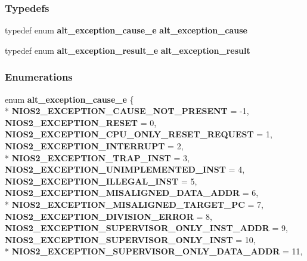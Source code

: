 \subsubsection*{Typedefs}
\begin{DoxyCompactItemize}
\item 
typedef enum {\bf alt\+\_\+exception\+\_\+cause\+\_\+e} {\bf alt\+\_\+exception\+\_\+cause}
\item 
typedef enum {\bf alt\+\_\+exception\+\_\+result\+\_\+e} {\bf alt\+\_\+exception\+\_\+result}
\end{DoxyCompactItemize}
\subsubsection*{Enumerations}
\begin{DoxyCompactItemize}
\item 
enum {\bf alt\+\_\+exception\+\_\+cause\+\_\+e} \{ \\*
{\bf N\+I\+O\+S2\+\_\+\+E\+X\+C\+E\+P\+T\+I\+O\+N\+\_\+\+C\+A\+U\+S\+E\+\_\+\+N\+O\+T\+\_\+\+P\+R\+E\+S\+E\+NT} = -\/1, 
{\bf N\+I\+O\+S2\+\_\+\+E\+X\+C\+E\+P\+T\+I\+O\+N\+\_\+\+R\+E\+S\+ET} = 0, 
{\bf N\+I\+O\+S2\+\_\+\+E\+X\+C\+E\+P\+T\+I\+O\+N\+\_\+\+C\+P\+U\+\_\+\+O\+N\+L\+Y\+\_\+\+R\+E\+S\+E\+T\+\_\+\+R\+E\+Q\+U\+E\+ST} = 1, 
{\bf N\+I\+O\+S2\+\_\+\+E\+X\+C\+E\+P\+T\+I\+O\+N\+\_\+\+I\+N\+T\+E\+R\+R\+U\+PT} = 2, 
\\*
{\bf N\+I\+O\+S2\+\_\+\+E\+X\+C\+E\+P\+T\+I\+O\+N\+\_\+\+T\+R\+A\+P\+\_\+\+I\+N\+ST} = 3, 
{\bf N\+I\+O\+S2\+\_\+\+E\+X\+C\+E\+P\+T\+I\+O\+N\+\_\+\+U\+N\+I\+M\+P\+L\+E\+M\+E\+N\+T\+E\+D\+\_\+\+I\+N\+ST} = 4, 
{\bf N\+I\+O\+S2\+\_\+\+E\+X\+C\+E\+P\+T\+I\+O\+N\+\_\+\+I\+L\+L\+E\+G\+A\+L\+\_\+\+I\+N\+ST} = 5, 
{\bf N\+I\+O\+S2\+\_\+\+E\+X\+C\+E\+P\+T\+I\+O\+N\+\_\+\+M\+I\+S\+A\+L\+I\+G\+N\+E\+D\+\_\+\+D\+A\+T\+A\+\_\+\+A\+D\+DR} = 6, 
\\*
{\bf N\+I\+O\+S2\+\_\+\+E\+X\+C\+E\+P\+T\+I\+O\+N\+\_\+\+M\+I\+S\+A\+L\+I\+G\+N\+E\+D\+\_\+\+T\+A\+R\+G\+E\+T\+\_\+\+PC} = 7, 
{\bf N\+I\+O\+S2\+\_\+\+E\+X\+C\+E\+P\+T\+I\+O\+N\+\_\+\+D\+I\+V\+I\+S\+I\+O\+N\+\_\+\+E\+R\+R\+OR} = 8, 
{\bf N\+I\+O\+S2\+\_\+\+E\+X\+C\+E\+P\+T\+I\+O\+N\+\_\+\+S\+U\+P\+E\+R\+V\+I\+S\+O\+R\+\_\+\+O\+N\+L\+Y\+\_\+\+I\+N\+S\+T\+\_\+\+A\+D\+DR} = 9, 
{\bf N\+I\+O\+S2\+\_\+\+E\+X\+C\+E\+P\+T\+I\+O\+N\+\_\+\+S\+U\+P\+E\+R\+V\+I\+S\+O\+R\+\_\+\+O\+N\+L\+Y\+\_\+\+I\+N\+ST} = 10, 
\\*
{\bf N\+I\+O\+S2\+\_\+\+E\+X\+C\+E\+P\+T\+I\+O\+N\+\_\+\+S\+U\+P\+E\+R\+V\+I\+S\+O\+R\+\_\+\+O\+N\+L\+Y\+\_\+\+D\+A\+T\+A\+\_\+\+A\+D\+DR} = 11, 

\end{DoxyCompactItemize}
